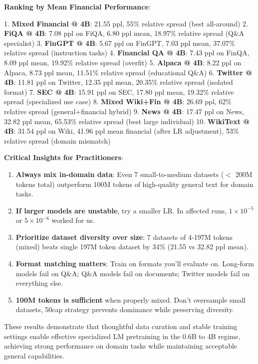 \textbf{Ranking by Mean Financial Performance}:

1. \textbf{Mixed Financial @ 4B}: 21.55 ppl, 55\% relative spread (best all-around)
2. \textbf{FiQA @ 4B}: 7.08 ppl on FiQA, 6.80 ppl mean, 18.97\% relative spread (Q\&A specialist)
3. \textbf{FinGPT @ 4B}: 5.67 ppl on FinGPT, 7.03 ppl mean, 37.07\% relative spread (instruction tasks)
4. \textbf{Financial QA @ 4B}: 7.43 ppl on FinQA, 8.09 ppl mean, 19.92\% relative spread (overfit)
5. \textbf{Alpaca @ 4B}: 8.22 ppl on Alpaca, 8.73 ppl mean, 11.51\% relative spread (educational Q\&A)
6. \textbf{Twitter @ 4B}: 11.81 ppl on Twitter, 12.35 ppl mean, 20.35\% relative spread (isolated format)
7. \textbf{SEC @ 4B}: 15.91 ppl on SEC, 17.80 ppl mean, 19.32\% relative spread (specialized use case)
8. \textbf{Mixed Wiki+Fin @ 4B}: 26.69 ppl, 62\% relative spread (general+financial hybrid)
9. \textbf{News @ 4B}: 17.47 ppl on News, 32.82 ppl mean, 65.53\% relative spread (best large individual)
10. \textbf{WikiText @ 4B}: 31.54 ppl on Wiki, 41.96 ppl mean financial (after LR adjustment), \~53\% relative spread (domain mismatch)

\textbf{Critical Insights for Practitioners}:

\begin{enumerate}
\item \textbf{Always mix in-domain data}: Even 7 small-to-medium datasets ($<$ 200M tokens total) outperform 100M tokens of high-quality general text for domain tasks.
\item \textbf{If larger models are unstable}, try a smaller LR. In affected runs, $1\times10^{-5}$ or $5\times10^{-6}$ worked for us.
\item \textbf{Prioritize dataset diversity over size}: 7 datasets of 4-197M tokens (mixed) beats single 197M token dataset by 34\% (21.55 vs 32.82 ppl mean).
\item \textbf{Format matching matters}: Train on formats you'll evaluate on. Long-form models fail on Q\&A; Q\&A models fail on documents; Twitter models fail on everything else.
\item \textbf{100M tokens is sufficient} when properly mixed. Don't oversample small datasets, 50cap strategy prevents dominance while preserving diversity.
\end{enumerate}

These results demonstrate that thoughtful data curation and stable training settings enable effective specialized LM pretraining in the 0.6B to 4B regime, achieving strong performance on domain tasks while maintaining acceptable general capabilities.
